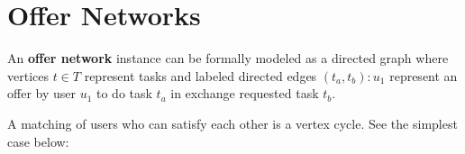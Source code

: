 \documentclass[main.tex]{subfiles}
\begin{document}
\section{Offer Networks}
An \textbf{offer network} instance can be formally modeled as a directed graph where vertices $t \in T$ represent tasks and labeled directed edges $(t_a,t_b) : u_1$ represent an offer by user $u_1$ to do task $t_a$ in exchange requested task $t_b$.
\begin{center}
\end{center}

A matching of users who can satisfy each other is a vertex cycle. See the simplest case below:

\begin{center}
\end{center}
\end{document}
